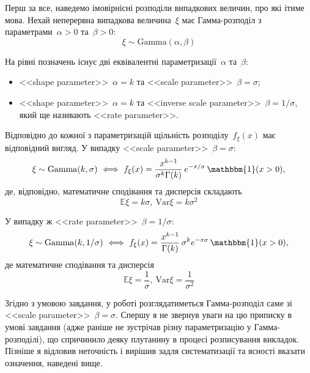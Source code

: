 Перш за все, наведемо імовірнісні розподіли випадкових величин, про які ітиме мова. Нехай неперервна випадкова величина~$\xi$ має Гамма-розподіл з параметрами~$\alpha>0$ та~$\beta>0:$
\begin{equation}
    \xi \sim \mathrm{Gamma}(\alpha,\beta)
\end{equation}

На рівні позначень існує дві еквівалентні параметризації~$\alpha$ та~$\beta:$
\begin{itemize}
    \item <<shape parameter>>~$\alpha=k$ та <<scale parameter>>~$\beta=\sigma$;
    \item <<shape parameter>>~$\alpha=k$ та <<inverse scale parameter>>~$\beta=1/\sigma$, який ще називають <<rate parameter>>.
\end{itemize}

Відповідно до кожної з параметризацій щільність розподілу~$f_{\xi}(x)$ має відповідний вигляд. У випадку <<scale parameter>>~$\beta=\sigma:$ 
\begin{equation}\label{eq: dGamma scale parameter}
    \xi \sim \mathrm{Gamma}(k,\sigma) \ \Longleftrightarrow \ f_{\xi}(x) = \frac{x^{k-1}}{\sigma^{k}\Gamma(k)}\, e^{-x/\sigma}\, \mathbbm{1}(x>0), 
\end{equation}
де, відповідно, математичне сподівання та дисперсія складають
\begin{equation}\label{eq: dGamma scale parameter mean}
    \mathbb{E}\xi = k\sigma,\ \mathrm{Var}\xi=k\sigma^2
\end{equation}

У випадку ж <<rate parameter>>~$\beta=1/\sigma:$ 
\begin{equation}\label{eq: dGamma rate parameter}
    \xi \sim \mathrm{Gamma}(k,1/\sigma) \ \Longleftrightarrow \ f_{\xi}(x) = \frac{x^{k-1}}{\Gamma(k)}\,\sigma^{k} e^{-x\sigma}\, \mathbbm{1}(x>0), 
\end{equation}
де математичне сподівання та дисперсія
\begin{equation}\label{eq: dGamma rate parameter mean}
    \mathbb{E}\xi = \frac{1}{\sigma},\ \mathrm{Var}\xi=\frac{1}{\sigma^2}
\end{equation}

\begin{remark}
    Згідно з умовою завдання, у роботі розглядатиметься Гамма-розподіл саме зі <<scale parameter>>~$\beta=\sigma$. Спершу я не звернув уваги на цю приписку в умові завдання (адже раніше не зустрічав різну параметризацію у Гамма-розподілі), що спричинило деяку плутанину в процесі розписування викладок. Пізніше я відловив неточність і вирішив задля систематизації та ясності вказати означення, наведені вище.   
\end{remark}

